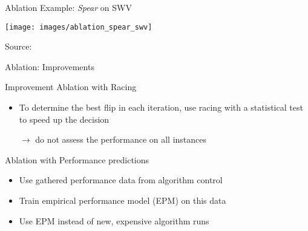 \begin{frame}[c]{Ablation Example: \textit{Spear} on SWV}

\centering
\texttt{[image: images/ablation\_spear\_swv]}

\small
\centering
Source: 
\end{frame}
\begin{frame}[c]{Ablation: Improvements}

\begin{block}{Improvement Ablation with Racing}
\begin{itemize}
  \item To determine the best flip in each iteration,
  		use \alert{racing} with a statistical test to speed up the decision
  \item[$\to$] do not assess the performance on all instances
\end{itemize}
\end{block}

\pause

\begin{block}{Ablation with Performance predictions}
\begin{itemize}
  \item Use gathered performance data from algorithm control
  \item Train empirical performance model (EPM) on this data
  \item Use EPM instead of new, expensive algorithm runs
\end{itemize}
\end{block}

\end{frame}

